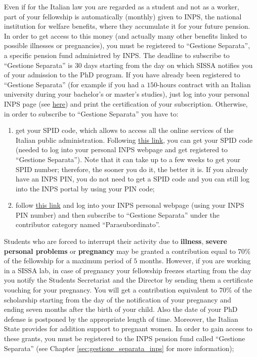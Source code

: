 \documentclass{sissavademecum}
\begin{document}
Even if for the Italian law you are regarded as a student and not as a worker, part of your fellowship is automatically (monthly) given to INPS, the national institution for welfare benefits, where they accumulate it for your future pension. In order to get access to this money (and actually many other benefits linked to possible illnesses or pregnancies), you must be registered to ``Gestione Separata'', a specific pension fund administred by INPS. The deadline to subscribe to ``Gestione Separata'' is $30$ days starting from the day on which SISSA notifies you of your admission to the PhD program. If you have already been registered to ``Gestione Separata'' (for example if you had a $150$-hours contract with an Italian university during your bachelor's or master's studies), just log into your personal INPS page (see \href{https://bit.ly/inpshome}{here}) and print the certification of your subscription. Otherwise, in order to subscribe to ``Gestione Separata'' you have to:
\begin{enumerate}
	\item get your SPID code, which allows to access all the online services of the Italian public administration. Following \href{https://www.spid.gov.it/richiedi-spid?lang=en-001}{this link}, you can get your SPID code (needed to log into your personal INPS webpage and get registered to ``Gestione Separata''). Note that it can take up to a few weeks to get your SPID number; therefore, the sooner you do it, the better it is. If you already have an INPS PIN, you do not need to get a SPID code and you can still log into the INPS portal by using your PIN code;
	\item follow \href{https://www.inps.it/myinps/default.aspx?accessoinps=1}{this link} and log into your INPS personal webpage (using your INPS PIN number) and then subscribe to ``Gestione Separata'' under the contributor category named ``Parasubordinato''.
\end{enumerate}

Students who are forced to interrupt their activity due to \textbf{illness}, \textbf{severe personal problems} or \textbf{pregnancy} may be granted a contribution equal to $70\%$ of the fellowship for a maximum period of $5$ months. However, if you are working in a SISSA lab, in case of pregnancy your fellowship freezes starting from the day you notify the Students Secretariat and the Director by sending them a certificate vouching for your pregnancy. You will get a contribution equivalent to $70\%$ of the scholarship starting from the day of the notification of your pregnancy and ending seven months after the birth of your child. Also the date of your PhD defense is postponed by the appropriate length of time. Moreover, the Italian State provides for addition support to pregnant women. In order to gain access to these grants, you must be registered to the INPS pension fund called ``Gestione Separata'' (see Chapter \ref{sec:gestione_separata_inps} for more information);
\end{document}
